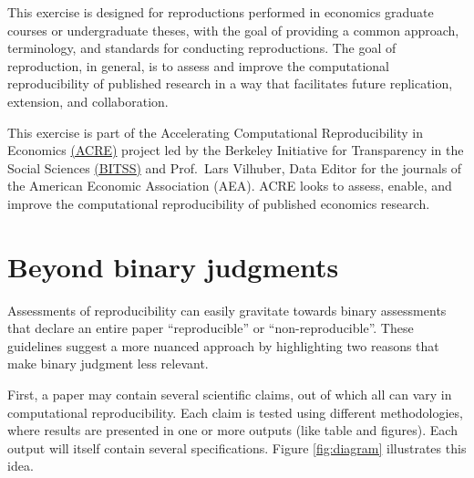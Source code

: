 \documentclass[]{book}
\begin{document}
This exercise is designed for reproductions performed in economics graduate courses or undergraduate theses, with the goal of providing a common approach, terminology, and standards for conducting reproductions. The goal of reproduction, in general, is to assess and improve the computational reproducibility of published research in a way that facilitates future replication, extension, and collaboration.

This exercise is part of the Accelerating Computational Reproducibility in Economics \href{https://www.bitss.org/ecosystem/acre/}{(ACRE)} project led by the Berkeley Initiative for Transparency in the Social Sciences \href{bitss.org}{(BITSS)} and Prof.~Lars Vilhuber, Data Editor for the journals of the American Economic Association (AEA). ACRE looks to assess, enable, and improve the computational reproducibility of published economics research.

\hypertarget{beyond-binary-judgments}{%
\section*{Beyond binary judgments}\label{beyond-binary-judgments}}

Assessments of reproducibility can easily gravitate towards binary assessments that declare an entire paper ``reproducible'' or ``non-reproducible''. These guidelines suggest a more nuanced approach by highlighting two reasons that make binary judgment less relevant.

First, a paper may contain several scientific claims, out of which all can vary in computational reproducibility. Each claim is tested using different methodologies, where results are presented in one or more outputs (like table and figures). Each output will itself contain several specifications. Figure \ref{fig:diagram} illustrates this idea.
\end{document}
